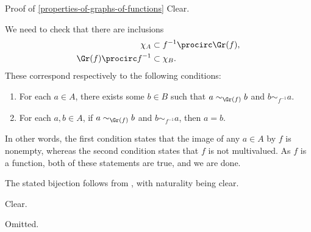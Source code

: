 \begin{Proof}{Proof of \cref{properties-of-graphs-of-functions}}%
    Clear.

    We need to check that there are inclusions
    \begin{align*}
        \chi_{A}              &\subset f^{-1}\procirc\Gr(f),\\
        \Gr(f)\procirc f^{-1} &\subset \chi_{B}.
    \end{align*}
    These correspond respectively to the following conditions:
    \begin{enumerate}%
        \item For each $a\in A$, there exists some $b\in B$ such that $a\sim_{\Gr(f)}b$ and $b\sim_{f^{-1}}a$.
        \item For each $a,b\in A$, if $a\sim_{\Gr(f)}b$ and $b\sim_{f^{-1}}a$, then $a=b$.
    \end{enumerate}%
    In other words, the first condition states that the image of any $a\in A$ by $f$ is nonempty, whereas the second condition states that $f$ is not multivalued. As $f$ is a function, both of these statements are true, and we are done.

    The stated bijection follows from , with naturality being clear.

    Clear.

    Omitted.


\end{Proof}
